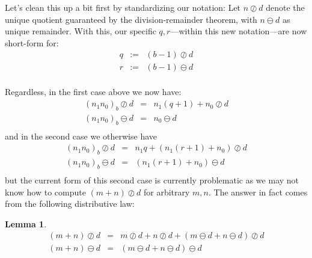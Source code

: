 \documentclass[twoside]{article}
\newtheorem{lemma}{Lemma}[section]
\begin{document}
Let's clean this up a bit first by standardizing our notation: Let $ n\oslash d $ denote the unique quotient guaranteed
by the division-remainder theorem, with $ n\ominus d $ as unique remainder. With this, our specific $ q,r $---within this
new notation---are now short-form for:
$$ \begin{array}{rcl}
q	& := &	(b-1)\oslash d	\\
r	& := &	(b-1)\ominus d	\\
\end{array} $$

Regardless, in the first case above we now have:
$$ \begin{array}{rcl}
(n_1n_0)_b\oslash d	& = &	n_1(q+1)+n_0\oslash d	\\
(n_1n_0)_b\ominus d	& = &	n_0\ominus d		\\
\end{array} $$
and in the second case we otherwise have
$$ \begin{array}{rcl}
(n_1n_0)_b\oslash d	& = &	n_1q+(n_1(r+1)+n_0)\oslash d	\\
(n_1n_0)_b\ominus d	& = &	(n_1(r+1)+n_0)\ominus d		\\
\end{array} $$
but the current form of this second case is currently problematic as we may not know how to compute
$ (m+n)\oslash d $ for arbitrary $ m,n $.  The answer in fact comes from the following distributive law:
\begin{lemma}
$$ \begin{array}{rcl}
(m+n)\oslash d & = & m\oslash d+n\oslash d+(m\ominus d+n\ominus d)\oslash d \\
(m+n)\ominus d & = & (m\ominus d+n\ominus d)\ominus d
\end{array} $$
\end{lemma}
\end{document}
